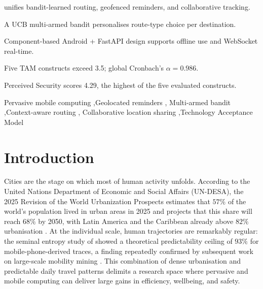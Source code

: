 \documentclass[a4paper,fleqn]{cas-sc}
\begin{document}
	\begin{highlights}
		\item \RUTAI{} unifies bandit-learned routing, geofenced reminders, and collaborative tracking.
		\item A UCB multi-armed bandit personalises route-type choice per destination.
		\item Component-based Android + FastAPI design supports offline use and WebSocket real-time.
		\item Five TAM constructs exceed 3.5; global Cronbach's $\alpha=0.986$.
		\item Perceived Security scores 4.29, the highest of the five evaluated constructs.
	\end{highlights}
	
	\begin{keywords}
		Pervasive mobile computing \sep Geolocated reminders \sep
		Multi-armed bandit \sep Context-aware routing \sep
		Collaborative location sharing \sep Technology Acceptance Model
	\end{keywords}
	
	\maketitle
	
	\section{Introduction}\label{sec:intro}
	
	Cities are the stage on which most of human activity unfolds. According to the United Nations Department of Economic and Social Affairs (UN-DESA), the 2025 Revision of the World Urbanization Prospects estimates that $57\%$ of the world's population lived in urban areas in 2025 and projects that this share will reach $68\%$ by 2050, with Latin America and the Caribbean already above $82\%$ urbanisation \citep{undesa2025wup}. At the individual scale, human trajectories are remarkably regular: the seminal entropy study of \citet{song2010predictability} showed a theoretical predictability ceiling of $93\%$ for mobile-phone-derived traces, a finding repeatedly confirmed by subsequent work on large-scale mobility mining \citep{cagney2025urban,liu2022route}. This combination of dense urbanisation and predictable daily travel patterns delimits a research space where pervasive and mobile computing can deliver large gains in efficiency, wellbeing, and safety.
	
\end{document}
